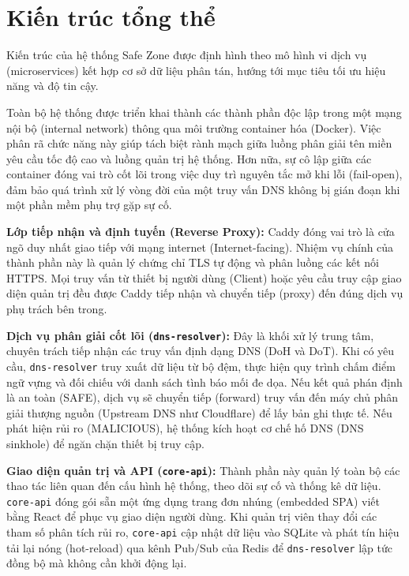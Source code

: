 \section{Kiến trúc tổng thể}

Kiến trúc của hệ thống Safe Zone được định hình theo mô hình vi dịch vụ (microservices) kết hợp cơ sở dữ liệu phân tán, hướng tới mục tiêu tối ưu hiệu năng và độ tin cậy.



Toàn bộ hệ thống được triển khai thành các thành phần độc lập trong một mạng nội bộ (internal network) thông qua môi trường container hóa (Docker). Việc phân rã chức năng này giúp tách biệt rành mạch giữa luồng phân giải tên miền yêu cầu tốc độ cao và luồng quản trị hệ thống. Hơn nữa, sự cô lập giữa các container đóng vai trò cốt lõi trong việc duy trì nguyên tắc mở khi lỗi (fail-open), đảm bảo quá trình xử lý vòng đời của một truy vấn DNS không bị gián đoạn khi một phần mềm phụ trợ gặp sự cố.

\textbf{Lớp tiếp nhận và định tuyến (Reverse Proxy):}
Caddy đóng vai trò là cửa ngõ duy nhất giao tiếp với mạng internet (Internet-facing). Nhiệm vụ chính của thành phần này là quản lý chứng chỉ TLS tự động và phân luồng các kết nối HTTPS. Mọi truy vấn từ thiết bị người dùng (Client) hoặc yêu cầu truy cập giao diện quản trị đều được Caddy tiếp nhận và chuyển tiếp (proxy) đến đúng dịch vụ phụ trách bên trong.

\textbf{Dịch vụ phân giải cốt lõi (\texttt{dns-resolver}):}
Đây là khối xử lý trung tâm, chuyên trách tiếp nhận các truy vấn định dạng DNS (DoH và DoT). Khi có yêu cầu, \texttt{dns-resolver} truy xuất dữ liệu từ bộ đệm, thực hiện quy trình chấm điểm ngữ vựng và đối chiếu với danh sách tình báo mối đe dọa. Nếu kết quả phán định là an toàn (SAFE), dịch vụ sẽ chuyển tiếp (forward) truy vấn đến máy chủ phân giải thượng nguồn (Upstream DNS như Cloudflare) để lấy bản ghi thực tế. Nếu phát hiện rủi ro (MALICIOUS), hệ thống kích hoạt cơ chế hố DNS (DNS sinkhole) để ngăn chặn thiết bị truy cập.

\textbf{Giao diện quản trị và API (\texttt{core-api}):}
Thành phần này quản lý toàn bộ các thao tác liên quan đến cấu hình hệ thống, theo dõi sự cố và thống kê dữ liệu. \texttt{core-api} đóng gói sẵn một ứng dụng trang đơn nhúng (embedded SPA) viết bằng React để phục vụ giao diện người dùng. Khi quản trị viên thay đổi các tham số phân tích rủi ro, \texttt{core-api} cập nhật dữ liệu vào SQLite và phát tín hiệu tải lại nóng (hot-reload) qua kênh Pub/Sub của Redis để \texttt{dns-resolver} lập tức đồng bộ mà không cần khởi động lại.

